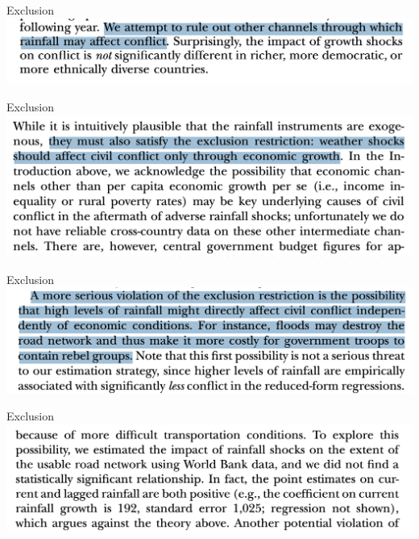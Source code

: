 \documentclass[11pt,xcolor=table]{beamer}
\begin{document}
\begin{frame}{Exclusion}
\includegraphics[width=\textwidth]{figures/IV Rain/exclusion.png}
\end{frame}



\begin{frame}{Exclusion}
\includegraphics[width=\textwidth]{figures/IV Rain/exclusion 1.png}
\end{frame}


\begin{frame}{Exclusion}
\includegraphics[width=\textwidth]{figures/IV Rain/exclusion 2.png}
\end{frame}


\begin{frame}{Exclusion}
\includegraphics[width=\textwidth]{figures/IV Rain/exclusion 3.png}
\end{frame}
\end{document}

